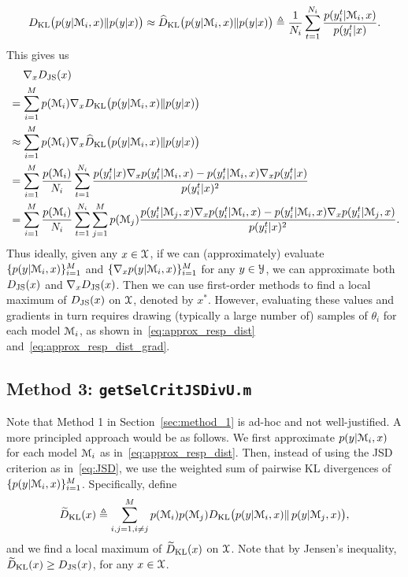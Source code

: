 \documentclass[11pt]{article}
\numberwithin{equation}{section}
\begin{document}
\begin{align}
D_{\rm KL}\big(p(y|\mathcal{M}_i,x)\Vert p(y|x)\big)\approx \widehat{D}_{\rm KL}\big(p(y|\mathcal{M}_i,x)\Vert p(y|x)\big)\triangleq \frac{1}{N_i}\sum_{t=1}^{N_i} \frac{p(y_{i}^t|\mathcal{M}_i,x)}{p(y_i^t|x)}. 
\end{align}
This gives us 
\begin{align}
&\quad\; \nabla_x D_{\rm JS}(x)\nonumber\\
&= \sum_{i=1}^M p(\mathcal{M}_i) \nabla_x D_{\rm KL}\big(p(y|\mathcal{M}_i,x)\Vert p(y|x)\big)\nonumber\\
&\approx \sum_{i=1}^M p(\mathcal{M}_i)\nabla_x \widehat{D}_{\rm KL}\big(p(y|\mathcal{M}_i,x)\Vert p(y|x)\big)\nonumber\\
&= \sum_{i=1}^M \frac{p(\mathcal{M}_i)}{N_i}\sum_{t=1}^{N_i} \frac{p(y_i^t|x)\nabla_x p(y_{i}^t|\mathcal{M}_i,x)-p(y_{i}^t|\mathcal{M}_i,x)\nabla_x p(y_i^t|x)}{p(y_i^t|x)^2}\nonumber\\
&= \sum_{i=1}^M \frac{p(\mathcal{M}_i)}{N_i}\sum_{t=1}^{N_i}\sum_{j=1}^{M} p(\mathcal{M}_j) \frac{p(y_i^t|\mathcal{M}_j,x)\nabla_x p(y_{i}^t|\mathcal{M}_i,x)-p(y_{i}^t|\mathcal{M}_i,x)\nabla_x p(y_i^t|\mathcal{M}_j,x)}{p(y_i^t|x)^2}.
\end{align}
Thus ideally, given any $x\in\mathcal{X}$, if we can (approximately) evaluate $\{p(y|\mathcal{M}_i,x)\}_{i=1}^M$ and $\{\nabla_x p(y|\mathcal{M}_i,x)\}_{i=1}^M$ for any $y\in\mathcal{Y}$, we can approximate both $D_{\rm JS}(x)$ and $\nabla_x D_{\rm JS}(x)$.  Then we can use first-order methods to find a local maximum of $D_{\rm JS}(x)$ on $\mathcal{X}$, denoted by $x^*$.
However, evaluating these values and gradients in turn requires drawing (typically a large number of) samples of $\theta_i$ for each model $\mathcal{M}_i$, as shown in~\eqref{eq:approx_resp_dist} and~\eqref{eq:approx_resp_dist_grad}.  


\subsection{Method 3: {\tt getSelCritJSDivU.m}}
Note that Method 1 in Section~\ref{sec:method_1} is ad-hoc and not well-justified. A  more principled approach would be as follows. We first approximate $p(y|\mathcal{M}_i,x)$ for each model $\mathcal{M}_i$ as in~\eqref{eq:approx_resp_dist}. Then, instead of using the JSD criterion as in~\eqref{eq:JSD}, we use the weighted sum of pairwise KL divergences of $\{p(y|\mathcal{M}_i,x)\}_{i=1}^M$. 
Specifically, define
\begin{equation}
\widetilde{D}_{\rm KL}(x) \triangleq \sum_{i,j=1,i\ne j}^M p(\mathcal{M}_i)p(\mathcal{M}_j) D_{\rm KL}\big(p(y|\mathcal{M}_i,x)\Vert\, p(y|\mathcal{M}_j,x)\big),
\end{equation}
and we
find a local maximum of $\widetilde{D}_{\rm KL}(x)$ on $\mathcal{X}$. Note that by Jensen's inequality, $\widetilde{D}_{\rm KL}(x)\ge D_{\rm JS}(x)$, for any $x\in\mathcal{X}$. 
\end{document}

